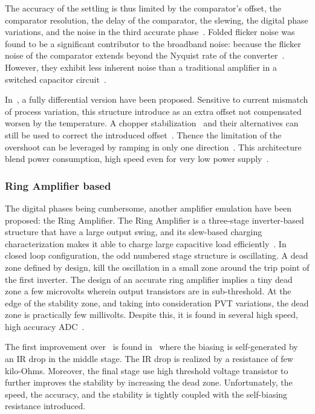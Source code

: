 The accuracy of the settling is thus limited by the comparator's offset, the comparator resolution, the delay of the comparator, the slewing, the digital phase variations, and the noise in the third accurate phase~\cite{Fiorenza2006}.
Folded flicker noise was found to be a significant contributor to the broadband noise: because the flicker noise of the comparator extends beyond the Nyquist rate of the converter~\cite{Sepke2008}. However, they exhibit less inherent noise than a traditional amplifier in a switched capacitor circuit~\cite{Fiorenza2006}.

In~\cite{Brooks2009}, a fully differential version have been proposed. Sensitive to current mismatch of process variation, this structure introduce as an extra offset not compensated worsen by the temperature. A chopper stabilization~\cite{Toth2003} and their alternatives can still be used to correct the introduced offset~\cite{Brooks2009}.
Thence the limitation of the overshoot can be leveraged by ramping in only one direction~\cite{Lee2012}. This architecture blend power consumption, high speed even for very low power supply~\cite{Steyaert2012}.

		\subsubsection{Ring Amplifier based}
The digital phases being cumbersome, another amplifier emulation have been proposed: the Ring Amplifier. The Ring Amplifier is a three-stage inverter-based structure that have a large output swing, and its slew-based charging characterization makes it able to charge large capacitive load efficiently~\cite{Hershberg2012}.
In closed loop configuration, the odd numbered stage structure is oscillating. A dead zone defined by design, kill the oscillation in a small zone around the trip point of the first inverter.
The design of an accurate ring amplifier implies a tiny dead zone a few microvolts wherein output transistors are in sub-threshold. At the edge of the stability zone, and taking into consideration PVT variations, the dead zone is practically few millivolts. Despite this, it is found in several high speed, high accuracy ADC~\cite{Hershberg2012,YLim2015,YLim2015FD,YCao2017}.

The first improvement over~\cite{Hershberg2012} is found in~\cite{YLim2015} where the biasing is self-generated by an IR drop in the middle stage. The IR drop is realized by a resistance of few kilo-Ohms. Moreover, the final stage use high threshold voltage transistor to further improves the stability by increasing the dead zone. Unfortunately, the speed, the accuracy, and the stability is tightly coupled with the self-biasing resistance introduced.

